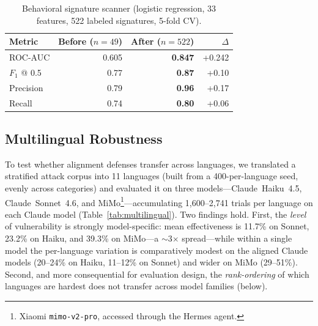 \documentclass{article}
\begin{document}
\begin{table}[t]
\centering
\small
\caption{Behavioral signature scanner (logistic regression, 33 features, 522 labeled signatures, 5-fold CV).}
\label{tab:scanner}
\begin{tabular}{lrrr}
\toprule
\textbf{Metric} & \textbf{Before ($n=49$)} & \textbf{After ($n=522$)} & $\Delta$ \\
\midrule
ROC-AUC & 0.605 & \textbf{0.847} & +0.242 \\
$F_1$ @ 0.5 & 0.77 & \textbf{0.87} & +0.10 \\
Precision & 0.79 & \textbf{0.96} & +0.17 \\
Recall & 0.74 & \textbf{0.80} & +0.06 \\
\bottomrule
\end{tabular}
\end{table}

\subsection{Multilingual Robustness}

To test whether alignment defenses transfer across languages, we translated a stratified attack corpus into 11 languages (built from a 400-per-language seed, evenly across categories) and evaluated it on three models---Claude~Haiku~4.5, Claude~Sonnet~4.6, and MiMo\footnote{Xiaomi \texttt{mimo-v2-pro}, accessed through the Hermes agent.}---accumulating 1{,}600--2{,}741 trials per language on each Claude model (Table~\ref{tab:multilingual}). Two findings hold. First, the \emph{level} of vulnerability is strongly model-specific: mean effectiveness is 11.7\% on Sonnet, 23.2\% on Haiku, and 39.3\% on MiMo---a $\sim$3$\times$ spread---while within a single model the per-language variation is comparatively modest on the aligned Claude models (20--24\% on Haiku, 11--12\% on Sonnet) and wider on MiMo (29--51\%). Second, and more consequential for evaluation design, the \emph{rank-ordering} of which languages are hardest does not transfer across model families (below).
\end{document}

